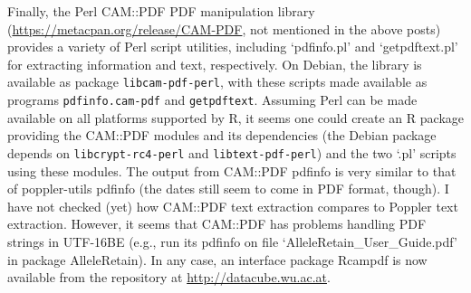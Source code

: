 \documentclass[a4paper]{article}
\newcommand{\file}[1]{`\textsf{#1}'}
\newcommand{\strong}[1]{{\normalfont\fontseries{b}\selectfont #1}}
\let\pkg=\strong
\begin{document}
Finally, the Perl CAM::PDF PDF manipulation library
(\url{https://metacpan.org/release/CAM-PDF}, not mentioned in the above
posts) provides a variety of Perl script utilities, including
\file{pdfinfo.pl} and \file{getpdftext.pl} for extracting information
and text, respectively.  On Debian, the library is available as package
\verb|libcam-pdf-perl|, with these scripts made available as programs
\verb|pdfinfo.cam-pdf| and \verb|getpdftext|.  Assuming Perl can be made
available on all platforms supported by R, it seems one could create an
R package providing the CAM::PDF modules and its dependencies (the
Debian package depends on \verb|libcrypt-rc4-perl| and
\verb|libtext-pdf-perl|) and the two \file{.pl} scripts using these
modules.  The output from CAM::PDF pdfinfo is very similar to that of
poppler-utils pdfinfo (the dates still seem to come in PDF format,
though).  I have not checked (yet) how CAM::PDF text extraction compares
to Poppler text extraction.  However, it seems that CAM::PDF has
problems handling PDF strings in UTF-16BE (e.g., run its pdfinfo on file
\file{AlleleRetain\_User\_Guide.pdf} in package \pkg{AlleleRetain}).  In
any case, an interface package \pkg{Rcampdf} is now available from the
repository at \url{http://datacube.wu.ac.at}.
\end{document}

